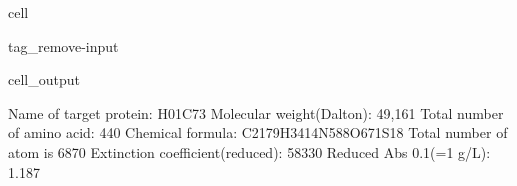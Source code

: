 \documentclass[letterpaper,10pt,english]{jupyterBook}
\begin{document}
\begin{sphinxuseclass}{cell}
\begin{sphinxuseclass}{tag_remove-input}\begin{sphinxVerbatimOutput}

\begin{sphinxuseclass}{cell_output}
\begin{sphinxVerbatim}[commandchars=\\\{\}]
\PYGZsh{} Name of target protein: \PYGZhy{}\PYGZhy{}\PYGZhy{}\PYGZhy{}\PYGZhy{}\PYGZhy{}\PYGZhy{}\PYGZhy{}\PYGZhy{}\PYGZhy{}\PYGZhy{}\PYGZhy{}\PYGZhy{}\PYGZhy{}\PYGZhy{}\PYGZhy{}\PYGZhy{}\PYGZhy{}\PYGZhy{}\PYGZhy{}\PYGZhy{}\PYGZhy{}\PYGZhy{}\PYGZhy{}\PYGZhy{}\PYGZhy{}\PYGZhy{}\PYGZhy{}\PYGZhy{}\PYGZhy{}\PYGZhy{}\PYGZhy{}\PYGZhy{}H\PYGZus{}01C73
\PYGZsh{} Molecular weight(Dalton): \PYGZhy{}\PYGZhy{}\PYGZhy{}\PYGZhy{}\PYGZhy{}\PYGZhy{}\PYGZhy{}\PYGZhy{}\PYGZhy{}\PYGZhy{}\PYGZhy{}\PYGZhy{}\PYGZhy{}\PYGZhy{}\PYGZhy{}\PYGZhy{}\PYGZhy{}\PYGZhy{}\PYGZhy{}\PYGZhy{}\PYGZhy{}\PYGZhy{}\PYGZhy{}\PYGZhy{}\PYGZhy{}\PYGZhy{}\PYGZhy{}\PYGZhy{}\PYGZhy{}\PYGZhy{}\PYGZhy{}\PYGZhy{}49,161
\PYGZsh{} Total number of amino acid: \PYGZhy{}\PYGZhy{}\PYGZhy{}\PYGZhy{}\PYGZhy{}\PYGZhy{}\PYGZhy{}\PYGZhy{}\PYGZhy{}\PYGZhy{}\PYGZhy{}\PYGZhy{}\PYGZhy{}\PYGZhy{}\PYGZhy{}\PYGZhy{}\PYGZhy{}\PYGZhy{}\PYGZhy{}\PYGZhy{}\PYGZhy{}\PYGZhy{}\PYGZhy{}\PYGZhy{}\PYGZhy{}\PYGZhy{}\PYGZhy{}\PYGZhy{}\PYGZhy{}\PYGZhy{}\PYGZhy{}\PYGZhy{}\PYGZhy{}440
\PYGZsh{} Chemical formula: \PYGZhy{}\PYGZhy{}\PYGZhy{}\PYGZhy{}\PYGZhy{}\PYGZhy{}\PYGZhy{}\PYGZhy{}\PYGZhy{}\PYGZhy{}\PYGZhy{}\PYGZhy{}\PYGZhy{}\PYGZhy{}\PYGZhy{}\PYGZhy{}\PYGZhy{}\PYGZhy{}\PYGZhy{}\PYGZhy{}\PYGZhy{}\PYGZhy{}\PYGZhy{}\PYGZhy{}\PYGZhy{}C2179H3414N588O671S18
\PYGZsh{} Total number of atom is \PYGZhy{}\PYGZhy{}\PYGZhy{}\PYGZhy{}\PYGZhy{}\PYGZhy{}\PYGZhy{}\PYGZhy{}\PYGZhy{}\PYGZhy{}\PYGZhy{}\PYGZhy{}\PYGZhy{}\PYGZhy{}\PYGZhy{}\PYGZhy{}\PYGZhy{}\PYGZhy{}\PYGZhy{}\PYGZhy{}\PYGZhy{}\PYGZhy{}\PYGZhy{}\PYGZhy{}\PYGZhy{}\PYGZhy{}\PYGZhy{}\PYGZhy{}\PYGZhy{}\PYGZhy{}\PYGZhy{}\PYGZhy{}\PYGZhy{}\PYGZhy{}\PYGZhy{}\PYGZhy{}6870
\PYGZsh{} Extinction coefficient(reduced): \PYGZhy{}\PYGZhy{}\PYGZhy{}\PYGZhy{}\PYGZhy{}\PYGZhy{}\PYGZhy{}\PYGZhy{}\PYGZhy{}\PYGZhy{}\PYGZhy{}\PYGZhy{}\PYGZhy{}\PYGZhy{}\PYGZhy{}\PYGZhy{}\PYGZhy{}\PYGZhy{}\PYGZhy{}\PYGZhy{}\PYGZhy{}\PYGZhy{}\PYGZhy{}\PYGZhy{}\PYGZhy{}\PYGZhy{}58330
\PYGZsh{} Reduced Abs 0.1\PYGZpc{}(=1 g/L): \PYGZhy{}\PYGZhy{}\PYGZhy{}\PYGZhy{}\PYGZhy{}\PYGZhy{}\PYGZhy{}\PYGZhy{}\PYGZhy{}\PYGZhy{}\PYGZhy{}\PYGZhy{}\PYGZhy{}\PYGZhy{}\PYGZhy{}\PYGZhy{}\PYGZhy{}\PYGZhy{}\PYGZhy{}\PYGZhy{}\PYGZhy{}\PYGZhy{}\PYGZhy{}\PYGZhy{}\PYGZhy{}\PYGZhy{}\PYGZhy{}\PYGZhy{}\PYGZhy{}\PYGZhy{}\PYGZhy{}\PYGZhy{}\PYGZhy{}1.187

\end{sphinxVerbatim}
\end{sphinxuseclass}
\end{sphinxVerbatimOutput}
\end{sphinxuseclass}
\end{sphinxuseclass}
\end{document}
